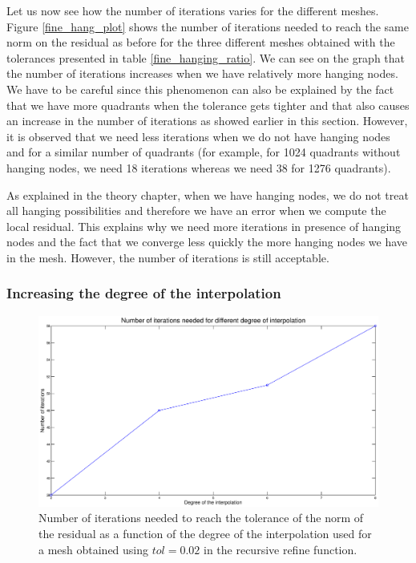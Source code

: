 Let us now see how the number of iterations varies for the different meshes. Figure \ref{fine_hang_plot} shows the number of iterations needed to reach the same norm on the residual as before for the three different meshes obtained with the tolerances presented in table \ref{fine_hanging_ratio}. We can see on the graph that the number of iterations increases when we have relatively more hanging nodes. We have to be careful since this phenomenon can also be explained by the fact that we have more quadrants when the tolerance gets tighter and that also causes an increase in the number of iterations as showed earlier in this section. However, it is observed that we need less iterations when we do not have hanging nodes and for a similar number of quadrants (for example, for 1024 quadrants without hanging nodes, we need 18 iterations whereas we need 38 for 1276 quadrants). 


As explained in the theory chapter, when we have hanging nodes, we do not treat all hanging possibilities and therefore we have an error when we compute the local residual. This explains why we need more iterations in presence of hanging nodes and the fact that we converge less quickly the more hanging nodes we have in the mesh. However, the number of iterations is still acceptable.

\subsubsection{Increasing the degree of the interpolation} 

\begin{figure}
\centering
\includegraphics[scale=0.35]{Results/fine_hang_deg.eps}
\caption{Number of iterations needed to reach the tolerance of the norm of the residual as a function of the degree of the interpolation used for a mesh obtained using $tol=0.02$ in the recursive refine function.}
\label{fine_hang_deg}
\end{figure}

